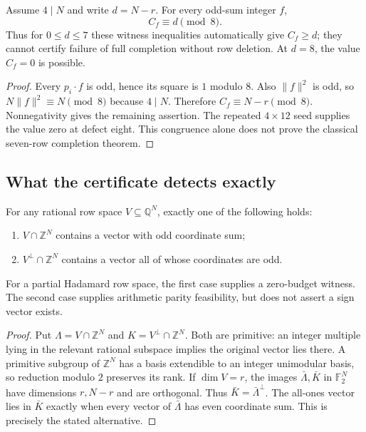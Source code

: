 \begin{proposition}
Assume $4\mid N$ and write $d=N-r$. For every odd-sum integer $f$,
\[
 C_f\equiv d\pmod8.
\]
Thus for $0\le d\le7$ these witness inequalities automatically give
$C_f\ge d$; they cannot certify failure of full completion without
row deletion. At $d=8$, the value $C_f=0$ is possible.
\end{proposition}
\begin{proof}
Every $p_i\cdot f$ is odd, hence its square is $1$ modulo $8$.
Also $\|f\|^2$ is odd, so $N\|f\|^2\equiv N\pmod8$ because
$4\mid N$. Therefore $C_f\equiv N-r\pmod8$.
Nonnegativity gives the remaining assertion. The repeated $4\times12$
seed supplies the value zero at defect eight. This congruence alone
does not prove the classical seven-row completion theorem.
\end{proof}

\subsection{What the certificate detects exactly}
\begin{theorem}
For any rational row space $V\subseteq\mathbb Q^N$, exactly one of
the following holds:
\begin{enumerate}
\item $V\cap\mathbb Z^N$ contains a vector with odd coordinate sum;
\item $V^\perp\cap\mathbb Z^N$ contains a vector all of whose
coordinates are odd.
\end{enumerate}
For a partial Hadamard row space, the first case supplies a zero-budget
witness. The second case supplies arithmetic parity feasibility,
but does not assert a sign vector exists.
\end{theorem}
\begin{proof}
Put $\Lambda=V\cap\mathbb Z^N$ and
$K=V^\perp\cap\mathbb Z^N$. Both are primitive: an integer multiple
lying in the relevant rational subspace implies the original vector
lies there. A primitive subgroup of $\mathbb Z^N$ has a basis
extendible to an integer unimodular basis, so reduction modulo $2$
preserves its rank. If $\dim V=r$, the images $\bar\Lambda,\bar K$
in $\mathbb F_2^N$ have dimensions $r,N-r$ and are orthogonal.
Thus $\bar K=\bar\Lambda^\perp$. The all-ones vector lies in
$\bar K$ exactly when every vector of $\bar\Lambda$ has even
coordinate sum. This is precisely the stated alternative.
\end{proof}

